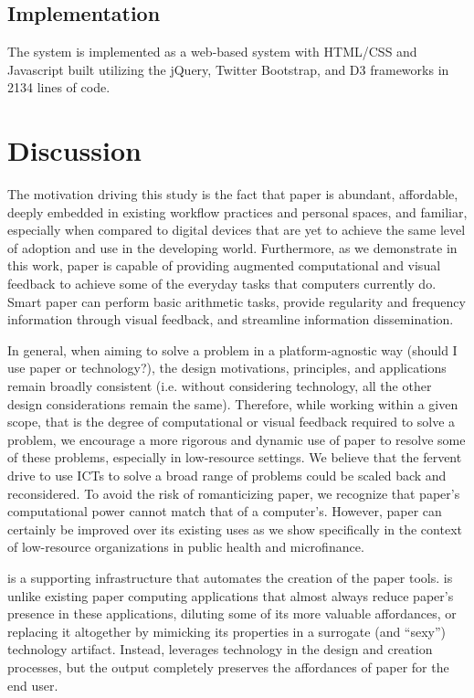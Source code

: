 \documentclass{sig-alternate}
\begin{document}
\subsection{Implementation}

The system is implemented as a web-based system with HTML/CSS and Javascript built utilizing the jQuery, Twitter Bootstrap, and D3 frameworks in 2134 lines of code. 



\section{Discussion}
\label{sec:discussion}

The motivation driving this study is the fact that paper is abundant, affordable, deeply embedded in existing workflow practices and personal spaces, and familiar, especially when compared to digital devices that are yet to achieve the same level of adoption and use in the developing world. Furthermore, as we demonstrate in this work, paper is capable of providing augmented computational and visual feedback to achieve some of the everyday tasks that computers currently do. Smart paper can perform basic arithmetic tasks, provide regularity and frequency information through visual feedback, and streamline information dissemination. 

In general, when aiming to solve a problem in a platform-agnostic way (should I use paper or technology?), the design motivations, principles, and applications remain broadly consistent (i.e. without considering technology, all the other design considerations remain the same). Therefore, while working within a given scope, that is the degree of computational or visual feedback required to solve a problem, we encourage a more rigorous and dynamic use of paper to resolve some of these problems, especially in low-resource settings. We believe that the fervent drive to use ICTs to solve a broad range of problems could be scaled back and reconsidered. To avoid the risk of romanticizing paper, we recognize that paper's computational power cannot match that of a computer's. However, paper can certainly be improved over its existing uses as we show specifically in the context of low-resource organizations in public health and microfinance.

\nifty is a supporting infrastructure that automates the creation of the paper tools. \nifty is unlike existing paper computing applications that almost always reduce paper's presence in these applications, diluting some of its more valuable affordances, or replacing it altogether by mimicking its properties in a surrogate (and ``sexy'') technology artifact. Instead, \nifty leverages technology in the design and creation processes, but the output completely preserves the affordances of paper for the end user.
\end{document}
